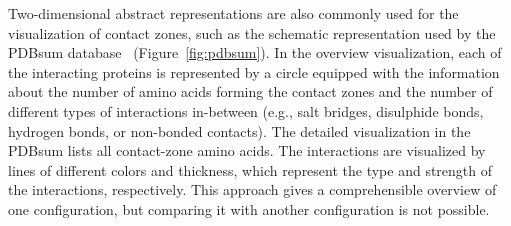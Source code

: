 \documentclass{bmcart}
\begin{document}

Two-dimensional abstract representations are also commonly used for the visualization of contact zones, such as the schematic representation used by the PDBsum database~\cite{pdbsum} (Figure~\ref{fig:pdbsum}).
In the overview visualization, each of the interacting proteins is represented by a circle equipped with the information about the number of amino acids forming the contact zones and the number of different types of interactions in-between (e.g., salt bridges, disulphide bonds, hydrogen bonds, or non-bonded contacts).
The detailed visualization in the PDBsum lists all contact-zone amino acids. 
The interactions are visualized by lines of different colors and thickness, which represent the type and strength of the interactions, respectively. 
This approach gives a comprehensible overview of one configuration, but comparing it with another configuration is not possible.


\end{document}
